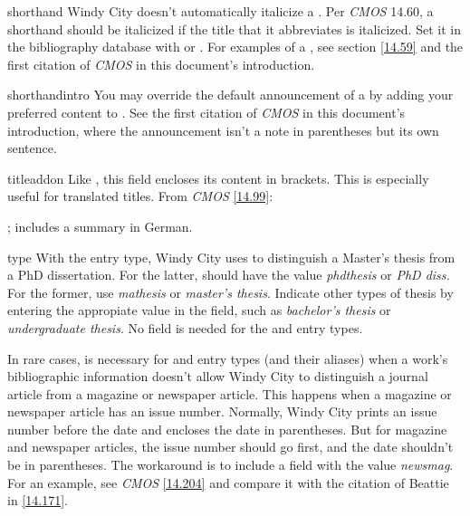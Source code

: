 \documentclass[11pt,letterpaper,oneside]{article}
\begin{document}
\begin{marglist}
\item[shorthand] Windy City doesn't automatically italicize a
. Per \textit{CMOS} 14.60, a shorthand should be
italicized if the title that it abbreviates is italicized. Set it in
the bibliography database with  or . For
examples of a , see section \ref{14.59} and the
first citation of \textit{CMOS} in this document's introduction.

\item[shorthandintro] You may override the default announcement of a
 by adding your preferred content to
. See the first citation of \textit{CMOS} in
this document's introduction, where the announcement isn't a note in
parentheses but its own sentence.

\item[titleaddon] Like , this field encloses its
content in brackets. This is especially useful for translated titles.
From \textit{CMOS} \ref{14.99}:

\begin{citebib}
\item \cite{wereszycki1977}; includes a summary in German.
\item \cite{pirumova1977b}
\end{citebib}

\item[type] With the  entry type, Windy City uses
 to distinguish a Master's thesis from a PhD
dissertation. For the latter,  should have the value
\textit{phdthesis} or \textit{PhD diss.} For the former, use
\textit{mathesis} or \textit{master's thesis}. Indicate other types of
thesis by entering the appropiate value in the field, such as
\textit{bachelor's thesis} or \textit{undergraduate thesis}. No
 field is needed for the  and
 entry types.

In rare cases,  is necessary for  and
 entry types (and their aliases) when a work's
bibliographic information doesn't allow Windy City to distinguish a
journal article from a magazine or newspaper article. This happens
when a magazine or newspaper article has an issue number. Normally,
Windy City prints an issue number before the date and encloses the
date in parentheses. But for magazine and newspaper articles, the
issue number should go first, and the date shouldn't be in
parentheses. The workaround is to include a  field with
the value \textit{newsmag}. For an example, see \textit{CMOS}
\ref{14.204} and compare it with the citation of Beattie in
\ref{14.171}.

\end{marglist}
\end{document}
